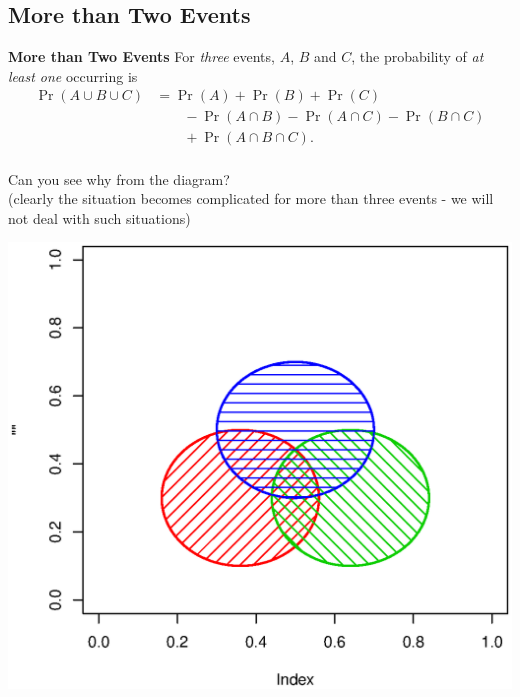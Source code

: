 \documentclass[compress]{beamer}        %
\makeatletter
\newcommand{\tcb}{\textcolor{beamer@blendedblue}}
\makeatother
\begin{document}
\subsection{More than Two Events}
\begin{frame}{\bf \tcb{More than Two Events}}
For \emph{three} events, $A$, $B$ and $C$, the probability of \emph{at least one} occurring is
\begin{align*}
\Pr(A \cup B \cup C) &= \Pr(A) + \Pr(B) + \Pr(C)\\
 &\qquad- \Pr(A \cap B) - \Pr(A \cap C) - \Pr(B \cap C)\\
 &\qquad+ \Pr(A \cap B \cap C).\\[-0.9cm]
\end{align*}
\begin{minipage}[b]{0.5\textwidth}
Can you see why from the diagram?\\[1.1cm]
{\footnotesize(clearly the situation becomes complicated for more than three events - we will not deal with such situations)}
\end{minipage}
\begin{minipage}[b]{0.49\textwidth}
\includegraphics[width=1\textwidth, trim = 3.3cm 3.8cm 2.3cm 4.8cm, clip]{AdditionRule3}
\end{minipage}

\end{frame}
\end{document}
